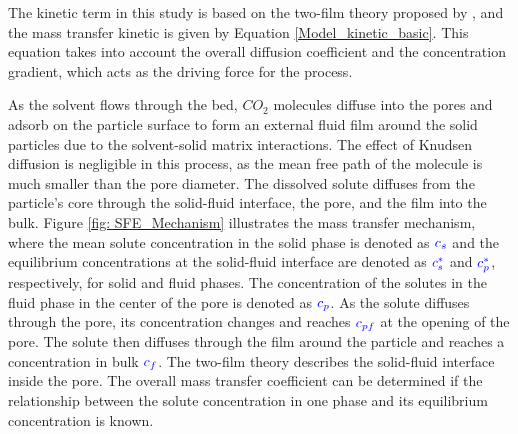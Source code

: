 \documentclass[../Article_Model_Parameters.tex]{subfiles}
\begin{document}
	The kinetic term in this study is based on the two-film theory proposed by \citet{Reverchon1996}, and the mass transfer kinetic is given by Equation \ref{Model_kinetic_basic}. This equation takes into account the overall diffusion coefficient and the concentration gradient, which acts as the driving force for the process.
	
	
	As the solvent flows through the bed, $CO_2$ molecules diffuse into the pores and adsorb on the particle surface to form an external fluid film around the solid particles due to the solvent-solid matrix interactions. The effect of Knudsen diffusion is negligible in this process, as the mean free path of the molecule is much smaller than the pore diameter. The dissolved solute diffuses from the particle's core through the solid-fluid interface, the pore, and the film into the bulk. Figure \ref{fig: SFE_Mechanism} illustrates the mass transfer mechanism, where the mean solute concentration in the solid phase is denoted as ${\color{blue}c_s}$ and the equilibrium concentrations at the solid-fluid interface are denoted as ${\color{blue}c_s^*}$ and ${\color{blue}c_p^*}$, respectively, for solid and fluid phases. The concentration of the solutes in the fluid phase in the center of the pore is denoted as ${\color{blue}c_{p}}$. As the solute diffuses through the pore, its concentration changes and reaches ${\color{blue}c_{pf}}$ at the opening of the pore. The solute then diffuses through the film around the particle and reaches a concentration in bulk ${\color{blue}c_f}$. The two-film theory describes the solid-fluid interface inside the pore. The overall mass transfer coefficient can be determined if the relationship between the solute concentration in one phase and its equilibrium concentration is known.
			
\end{document}
